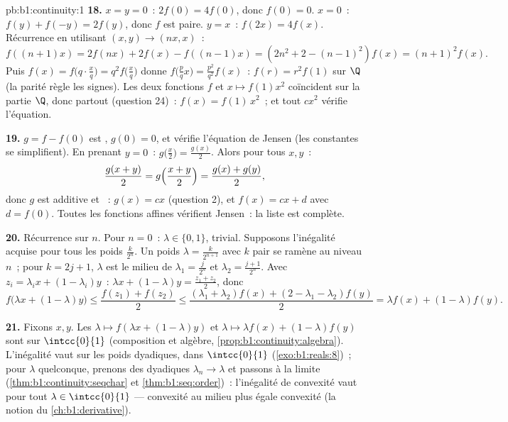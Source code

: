 \begin{solution}{pb:b1:continuity:1}
\textbf{18.} $x = y = 0$~: $2f(0) = 4f(0)$, donc $f(0) = 0$. $x =
0$~: $f(y) + f(-y) = 2f(y)$, donc $f$ est paire. $y = x$~: $f(2x) =
4f(x)$. Récurrence en utilisant $(x, y) \to (nx, x)$~:
\[
f((n{+}1)x) = 2f(nx) + 2f(x) - f((n{-}1)x)
= (2n^2 + 2 - (n-1)^2) f(x) = (n+1)^2 f(x) .
\]
Puis $f(x) = f\bigl(q\cdot\frac xq\bigr) = q^2 f\bigl(\frac
xq\bigr)$ donne $f\bigl(\frac pq x\bigr) = \frac{p^2}{q^2}f(x)$~:
$f(r) = r^2 f(1)$ sur $\Q$ (la parité règle les signes). Les deux
fonctions  $f$ et $x \mapsto f(1)x^2$ coïncident sur la
partie  $\Q$, donc partout (question 24)~: $f(x) =
f(1)\,x^2$~; et tout $cx^2$ vérifie l'équation.

\textbf{19.} $g = f - f(0)$ est , $g(0) = 0$, et
vérifie l'équation de Jensen (les constantes se simplifient). En
prenant $y = 0$~: $g\bigl(\frac x2\bigr) = \frac{g(x)}{2}$. Alors pour
tous $x, y$~:
\[
\frac{g(x + y)}{2} = g\Bigl(\frac{x+y}{2}\Bigr)
= \frac{g(x) + g(y)}{2} ,
\]
donc $g$ est additive et ~: $g(x) = cx$ (question 2), et
$f(x) = cx + d$ avec $d = f(0)$. Toutes les fonctions affines vérifient
Jensen~: la liste est complète.

\textbf{20.} Récurrence sur $n$. Pour $n = 0$~: $\lambda \in \{0,
1\}$, trivial. Supposons l'inégalité acquise pour tous les poids
$\frac{k}{2^n}$. Un poids $\lambda = \frac{k}{2^{n+1}}$ avec $k$
pair se ramène au niveau $n$~; pour $k = 2j + 1$, $\lambda$ est le
milieu de $\lambda_1 = \frac{j}{2^n}$ et $\lambda_2 =
\frac{j+1}{2^n}$. Avec $z_i = \lambda_i x + (1 - \lambda_i)y$~:
$\lambda x + (1-\lambda)y = \frac{z_1 + z_2}{2}$, donc
\[
f\bigl(\lambda x + (1{-}\lambda)y\bigr)
\leq \frac{f(z_1) + f(z_2)}{2}
\leq \frac{(\lambda_1 + \lambda_2)f(x) + (2 - \lambda_1 -
\lambda_2)f(y)}{2}
= \lambda f(x) + (1 - \lambda)f(y) .
\]

\textbf{21.} Fixons $x, y$. Les  $\lambda \mapsto f(\lambda
x + (1 - \lambda)y)$ et $\lambda \mapsto \lambda f(x) + (1 -
\lambda)f(y)$ sont  sur $\intcc{0}{1}$ (composition et
algèbre, \cref{prop:b1:continuity:algebra}). L'inégalité
vaut sur les poids dyadiques,  dans $\intcc{0}{1}$
(\cref{exo:b1:reals:8})~; pour $\lambda$ quelconque, prenons des
dyadiques $\lambda_n \to \lambda$ et passons à la limite
(\cref{thm:b1:continuity:seqchar} et \cref{thm:b1:seq:order})~:
l'inégalité de convexité vaut pour tout $\lambda \in
\intcc{0}{1}$ --- convexité au milieu plus  égale
convexité (la notion du \cref{ch:b1:derivative}).


\end{solution}
